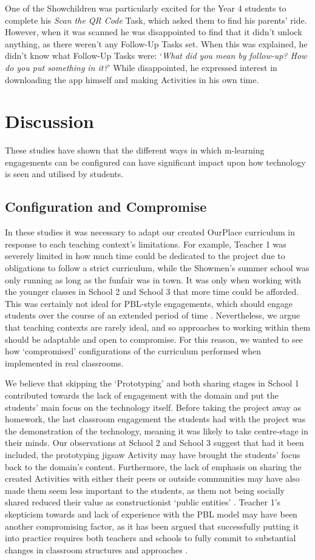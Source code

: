 \documentclass[,hyphens]{sigchi}
\begin{document}
One of the Showchildren was particularly excited for the Year 4 students to complete his \textit{Scan the QR Code} Task, which asked them to find his parents' ride. However, when it was scanned he was disappointed to find that it didn't unlock anything, as there weren't any Follow-Up Tasks set. When this was explained, he didn't know what Follow-Up Tasks were: `\textit{What did you mean by follow-up? How do you put something in it?}' While disappointed, he expressed interest in downloading the app himself and making Activities in his own time.

\section{Discussion}
These studies have shown that the different ways in which m-learning engagements can be configured can have significant impact upon how technology is seen and utilised by students.

\subsection{Configuration and Compromise}
In these studies it was necessary to adapt our created OurPlace curriculum in response to each teaching context's limitations. For example, Teacher 1 was severely limited in how much time could be dedicated to the project due to obligations to follow a strict curriculum, while the Showmen's summer school was only running as long as the funfair was in town. It was only when working with the younger classes in School 2 and School 3 that more time could be afforded. This was certainly not ideal for PBL-style engagements, which should engage students over the course of an extended period of time \cite{Blumenfeld1991}. Nevertheless, we argue that teaching contexts are rarely ideal, and so approaches to working within them should be adaptable and open to compromise. For this reason, we wanted to see how `compromised' configurations of the curriculum performed when implemented in real classrooms. 

We believe that skipping the `Prototyping' and both sharing stages in School 1 contributed towards the lack of engagement with the domain and put the students' main focus on the technology itself. Before taking the project away as homework, the last classroom engagement the students had with the project was the demonstration of the technology, meaning it was likely to take centre-stage in their minds. Our observations at School 2 and School 3 suggest that had it been included, the prototyping jigsaw Activity may have brought the students' focus back to the domain's content. Furthermore, the lack of emphasis on sharing the created Activities with either their peers or outside communities may have also made them seem less important to the students, as them not being socially shared reduced their value as constructionist `public entities' \cite{PapertSeymourandHarel1991a}. Teacher 1's skepticism towards and lack of experience with the PBL model may have been another compromising factor, as it has been argued that successfully putting it into practice requires both teachers and schools to fully commit to substantial changes in classroom structures and approaches \cite{InnovationUnit2016}.
\end{document}
